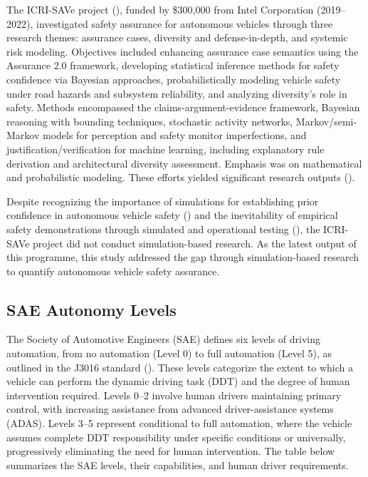 The ICRI-SAVe project (\cite{ICRI-SAVe2024}), funded by \$300,000 from Intel Corporation (2019–2022), investigated safety assurance for autonomous vehicles through three research themes: assurance cases, diversity and defense-in-depth, and systemic risk modeling. Objectives included enhancing assurance case semantics using the Assurance 2.0 framework, developing statistical inference methods for safety confidence via Bayesian approaches, probabilistically modeling vehicle safety under road hazards and subsystem reliability, and analyzing diversity's role in safety. Methods encompassed the claims-argument-evidence framework, Bayesian reasoning with bounding techniques, stochastic activity networks, Markov/semi-Markov models for perception and safety monitor imperfections, and justification/verification for machine learning, including explanatory rule derivation and architectural diversity assessment. Emphasis was on mathematical and probabilistic modeling. These efforts yielded significant research outputs 
(\cite{bishop2022bootstrapping,aghazadeh2022arguing,buerkle2022modelling,terrosi2022impact,salako2021conservative,zhao2020assessing,bloomfield2021assurance,rushby2022assessing,popov2021conservative}).

Despite recognizing the importance of simulations for establishing prior confidence in autonomous vehicle safety (\cite{Zhao_2019}) and the inevitability of empirical safety demonstrations through simulated and operational testing (\cite{zhao2020assessing}), the ICRI-SAVe project did not conduct simulation-based research. As the latest output of this programme, this study addressed the gap through simulation-based research to quantify autonomous vehicle safety assurance.

\subsection{SAE Autonomy Levels}

The Society of Automotive Engineers (SAE) defines six levels of driving automation, from no automation (Level 0) to full automation (Level 5), as outlined in the J3016 standard (\cite{SAEJ3016}). These levels categorize the extent to which a vehicle can perform the dynamic driving task (DDT) and the degree of human intervention required. Levels 0--2 involve human drivers maintaining primary control, with increasing assistance from advanced driver-assistance systems (ADAS). Levels 3--5 represent conditional to full automation, where the vehicle assumes complete DDT responsibility under specific conditions or universally, progressively eliminating the need for human intervention. The table below summarizes the SAE levels, their capabilities, and human driver requirements.

